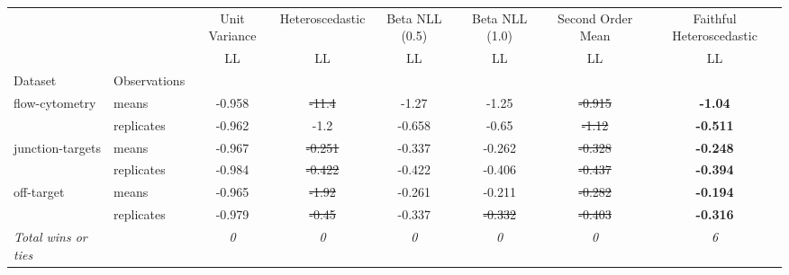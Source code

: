 \begin{tabular}{ll|c|c|c|c|c|c}
\toprule
{} & {} & {Unit Variance} & {Heteroscedastic} & {Beta NLL (0.5)} & {Beta NLL (1.0)} & {Second Order Mean} & {Faithful Heteroscedastic} \\
{} & {} & {LL} & {LL} & {LL} & {LL} & {LL} & {LL} \\
{Dataset} & {Observations} & {} & {} & {} & {} & {} & {} \\
\midrule
\multirow[t]{2}{*}{flow-cytometry} & means & -0.958 & \sout{-11.4} & -1.27 & -1.25 & \sout{-0.915} & \textbf{-1.04} \\
 & replicates & -0.962 & -1.2 & -0.658 & -0.65 & \sout{-1.12} & \textbf{-0.511} \\
\multirow[t]{2}{*}{junction-targets} & means & -0.967 & \sout{-0.251} & -0.337 & -0.262 & \sout{-0.328} & \textbf{-0.248} \\
 & replicates & -0.984 & \sout{-0.422} & -0.422 & -0.406 & \sout{-0.437} & \textbf{-0.394} \\
\multirow[t]{2}{*}{off-target} & means & -0.965 & \sout{-1.92} & -0.261 & -0.211 & \sout{-0.282} & \textbf{-0.194} \\
 & replicates & -0.979 & \sout{-0.45} & -0.337 & \sout{-0.332} & \sout{-0.403} & \textbf{-0.316} \\
\textit{{Total wins or ties}} &  & \textit{0} & \textit{0} & \textit{0} & \textit{0} & \textit{0} & \textit{6} \\
\bottomrule
\end{tabular}
